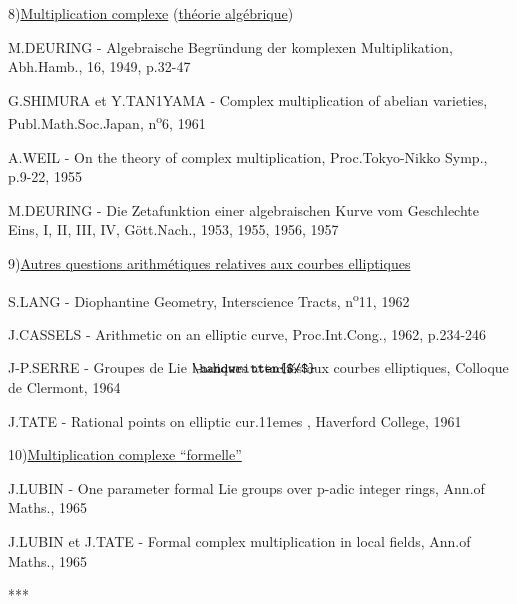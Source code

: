 \clearpage
{}
\reversemarginpar
{}
\normalmarginpar
{}

8)\quad \uline{Multiplication complexe} (\uline{théorie algébrique})

M.DEURING - Algebraische Begründung der komplexen Multiplikation, Abh.Hamb., 16, 1949, p.32-47

\reversemarginpar
{}
G.SHIMURA et Y.TAN1YAMA - Complex multiplication of abelian varieties, Publ.Math.Soc.Japan, n\textsuperscript{o}6, 1961

A.WEIL - On the theory of complex multiplication, Proc.Tokyo-Nikko Symp., p.9-22, 1955

M.DEURING - Die Zetafunktion einer algebraischen Kurve vom Geschlechte Eins, I, II, III, IV, Gött.Nach., 1953, 1955, 1956, 1957

9)\quad \uline{Autres questions arithmétiques relatives aux courbes elliptiques}

S.LANG - Diophantine Geometry, Interscience Tracts, n\textsuperscript{o}11, 1962

J.CASSELS - Arithmetic on an elliptic curve, Proc.Int.Cong., 1962, p.234-246

J-P.SERRE - Groupes de Lie $\mathord{\rlap{\handwritten{$/$}}\mathrm{l}}$-adiques attachés aux courbes elliptiques, Colloque de Clermont, 1964

J.TATE - Rational points on elliptic cur\makebox[0pt][l]{\deleted{:}}\kern.11emes , Haverford College, 1961

10)\quad \uline{Multiplication complexe ``formelle''}

J.LUBIN - One parameter formal Lie groups over $\mathrm{p}$-adic integer rings, Ann.of Maths., 1965

J.LUBIN et J.TATE - Formal complex multiplication in local fields, Ann.of Maths., 1965

\begin{center}
***
\end{center}
\normalmarginpar
